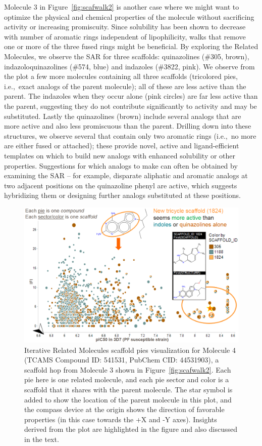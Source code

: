 \documentclass[11pt,letterpaper]{article}
\newcommand*\fref[1]{Figure~\ref{fig:#1}}
\newcommand*\ie{i.e.,~}
\begin{document}
Molecule 3 in \fref{scafwalk2} is another case where we might want to optimize the physical and chemical properties of the molecule without sacrificing activity or increasing promiscuity. Since solubility has been shown to decrease with number of aromatic rings independent of lipophilicity\cite{Hill2010}, walks that remove one or more of the three fused rings might be beneficial. By exploring the Related Molecules, we observe the SAR for three scaffolds: quinazolines (\#305, brown), indazoloquinazolines (\#574, blue) and indazoles (\#3822, pink). We observe from the plot a few more molecules containing all three scaffolds (tricolored pies, \ie exact analogs of the parent molecule); all of these are less active than the parent. The indazoles when they occur alone (pink circles) are far less active than the parent, suggesting they do not contribute significantly to activity and may be substituted. Lastly the quinazolines (brown) include several analogs that are more active and also less promiscuous than the parent. Drilling down into these structures, we observe several that contain only two aromatic rings (\ie no more are either fused or attached); these provide novel, active and ligand-efficient templates on which to build new analogs with enhanced solubility or other properties. Suggestions for which analogs to make can often be obtained by examining the SAR -- for example, disparate aliphatic and aromatic analogs at two adjacent positions on the quinazoline phenyl are active, which suggests hybridizing them or designing further analogs substituted at these positions.

\begin{figure}
\includegraphics[width=5.5in]{../fig/mol3_RGtool_scafpie_iter.png}
\caption{Iterative Related Molecules scaffold pies visualization for Molecule 4 (TCAMS Compound ID: 541531, PubChem CID: 44531903), a scaffold hop from Molecule 3 shown in \fref{scafwalk2}. Each pie here is one related molecule, and each pie sector and color is a scaffold that it shares with the parent molecule. The star symbol is added to show the location of the parent molecule in this plot, and the compass device at the origin shows the direction of favorable properties (in this case towards the +X and -Y axes). Insights derived from the plot are highlighted in the figure and also discussed in the text.}
\label{fig:scafwalk3}
\end{figure}
\end{document}
